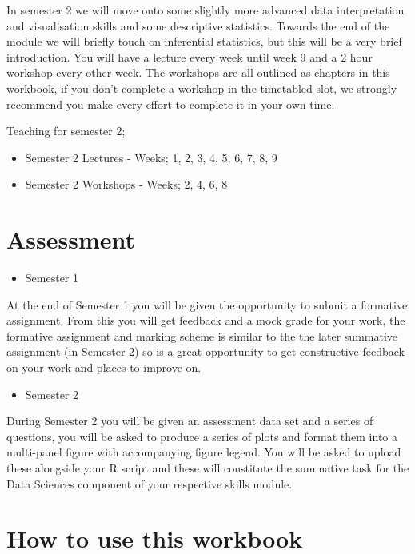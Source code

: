 \documentclass[
]{book}
\providecommand{\tightlist}{%
  \setlength{\itemsep}{0pt}\setlength{\parskip}{0pt}}
\begin{document}
In semester 2 we will move onto some slightly more advanced data interpretation and visualisation skills and some descriptive statistics. Towards the end of the module we will briefly touch on inferential statistics, but this will be a very brief introduction. You will have a lecture every week until week 9 and a 2 hour workshop every other week. The workshops are all outlined as chapters in this workbook, if you don't complete a workshop in the timetabled slot, we strongly recommend you make every effort to complete it in your own time.

Teaching for semester 2;

\begin{itemize}
\tightlist
\item
  Semester 2 Lectures - Weeks; 1, 2, 3, 4, 5, 6, 7, 8, 9
\item
  Semester 2 Workshops - Weeks; 2, 4, 6, 8
\end{itemize}

\section{Assessment}\label{assessment}

\begin{itemize}
\tightlist
\item
  Semester 1
\end{itemize}

At the end of Semester 1 you will be given the opportunity to submit a formative assignment. From this you will get feedback and a mock grade for your work, the formative assignment and marking scheme is similar to the the later summative assignment (in Semester 2) so is a great opportunity to get constructive feedback on your work and places to improve on.

\begin{itemize}
\tightlist
\item
  Semester 2
\end{itemize}

During Semester 2 you will be given an assessment data set and a series of questions, you will be asked to produce a series of plots and format them into a multi-panel figure with accompanying figure legend. You will be asked to upload these alongside your R script and these will constitute the summative task for the Data Sciences component of your respective skills module.

\section{How to use this workbook}\label{how-to-use-this-workbook}
\end{document}
